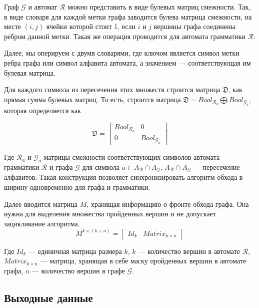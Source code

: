 Граф $\mathcal{G}$ и автомат $\mathcal{R}$ можно представить в виде булевых матриц смежности. Так, в виде словаря для каждой метки графа заводится булева матрица смежности, на месте $(i, j)$ ячейки которой стоит 1, если $i$ и $j$ вершины графа соединены ребром данной метки. Такая же операция проводится для автомата грамматики $\mathcal{R}$.

Далее, мы оперируем с двумя словарями, где ключом является символ метки ребра графа или символ алфавита автомата, а значением --- соответствующая им булевая матрица.

Для каждого символа из пересечения этих множеств строится матрица $\mathfrak{D}$, как прямая сумма булевых матриц. То есть, строится матрица $\mathfrak{D} = Bool_{\mathcal{R}_a} \bigoplus Bool_{\mathcal{G}_a}$, которая определяется как

\begin{equation}
\mathfrak{D} = 
  \left[
    \begin{matrix}
        Bool_{\mathcal{R}_a} & 0\\
        0 & Bool_{\mathcal{G}_a}
    \end{matrix}
  \right]
\end{equation}

Где $\mathcal{R}_{a}$ и $\mathcal{G}_{a}$ матрицы смежности соответствующих символов автомата грамматики $\mathcal{R}$ и графа $\mathcal{G}$ для символа $a \in A_\mathcal{R} \cap A_\mathcal{G}$, $A_\mathcal{R} \cap A_\mathcal{G}$ --- пересечение алфавитов. Такая конструкция позволяет синхронизировать алгоритм обхода в ширину одновременно для графа и грамматики.

Далее вводится матрица $M$, хранящая информацию о фронте обхода графа. Она нужна для выделения множества пройденных вершин и не допускает зацикливание алгоритма.
\begin{equation}
M^{k \times (k + n)} =
  \left[
    \begin{matrix}
        Id_k & Matrix_{k \times n }
    \end{matrix}
  \right]
\end{equation}

Где $Id_k$ --- единичная матрица размера $k$, $k$ --- количество вершин в автомате $\mathcal{R}$, $Matrix_{k \times n }$ --- матрица, хранящая в себе маску пройденных вершин в автомате графа, $n$ --- количество вершин в графе $\mathcal{G}$.

\subsection{Выходные данные}

